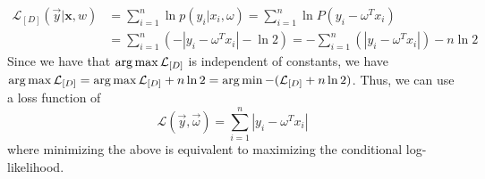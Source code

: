 \begin{align*}
    \mathcal{L}_{[D]}(\vec{y}|\mathbf{x},w) &= \sum_{i=1}^n \ln p(y_i | x_i, \omega) = \sum_{i=1}^n \ln P(y_i - \omega^T x_i)\\
        &= \sum_{i=1}^n \left(-|y_i - \omega^T x_i| - \ln 2\right) = -\sum_{i=1}^n \left(|y_i - \omega^T x_i|\right) - n \ln 2
\end{align*}
Since we have that $\operatorname*{arg\,max} \mathcal{L}_{[D]}$ is independent of constants, we have $\operatorname*{arg\,max} \mathcal{L}_{[D]} = \operatorname*{arg\,max} \mathcal{L}_{[D]} + n\ln 2 = \operatorname*{arg\,min} -(\mathcal{L}_{[D]} + n\ln 2)$. Thus, we can use a loss function of
\begin{equation*}
    \mathcal{L}(\vec{y}, \vec{\omega}) = \sum_{i=1}^n |y_i - \omega^T x_i|
\end{equation*}
where minimizing the above is equivalent to maximizing the conditional log-likelihood.